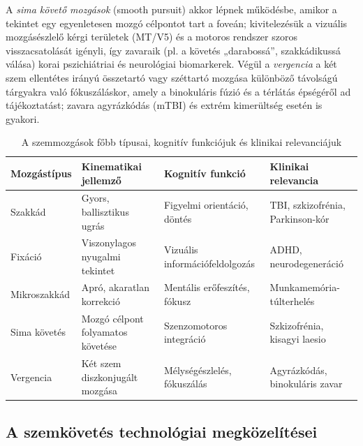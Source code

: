 \documentclass[12pt,a4paper,oneside]{book}
\begin{document}
A \emph{sima követő mozgások} (smooth pursuit) akkor lépnek működésbe, amikor a tekintet egy egyenletesen mozgó célpontot tart a foveán; kivitelezésük a vizuális mozgásészlelő kérgi területek (MT/V5) és a motoros rendszer szoros visszacsatolását igényli, így zavaraik (pl. a követés „darabossá”, szakkádikussá válása) korai pszichiátriai és neurológiai biomarkerek. Végül a \emph{vergencia} a két szem ellentétes irányú összetartó vagy széttartó mozgása különböző távolságú tárgyakra való fókuszáláskor, amely a binokuláris fúzió és a térlátás épségéről ad tájékoztatást; zavara agyrázkódás (mTBI) és extrém kimerültség esetén is gyakori.

\begin{table}[H]
    \centering
    \renewcommand{\arraystretch}{1.5}
    \caption{A szemmozgások főbb típusai, kognitív funkciójuk és klinikai relevanciájuk}
    \label{tab:eye_movements}
    \begin{tabular}{>{\centering\arraybackslash}p{2.5cm} >{\raggedright\arraybackslash}p{4.5cm} >{\centering\arraybackslash}p{3.5cm} >{\raggedright\arraybackslash}p{3.5cm}}
        \toprule
        \textbf{Mozgástípus} & \textbf{Kinematikai jellemző} & \textbf{Kognitív funkció} & \textbf{Klinikai relevancia} \\
        \midrule
        Szakkád & Gyors, ballisztikus ugrás & Figyelmi orientáció, döntés & TBI, szkizofrénia, Parkinson-kór \\
        Fixáció & Viszonylagos nyugalmi tekintet & Vizuális információfeldolgozás & ADHD, neurodegeneráció \\
        Mikroszakkád & Apró, akaratlan korrekció & Mentális erőfeszítés, fókusz & Munkamemória-túlterhelés \\
        Sima követés & Mozgó célpont folyamatos követése & Szenzomotoros integráció & Szkizofrénia, kisagyi laesio \\
        Vergencia & Két szem diszkonjugált mozgása & Mélységészlelés, fókuszálás & Agyrázkódás, binokuláris zavar \\
        \bottomrule
    \end{tabular}
\end{table}

\subsection{A szemkövetés technológiai megközelítései}
\end{document}
